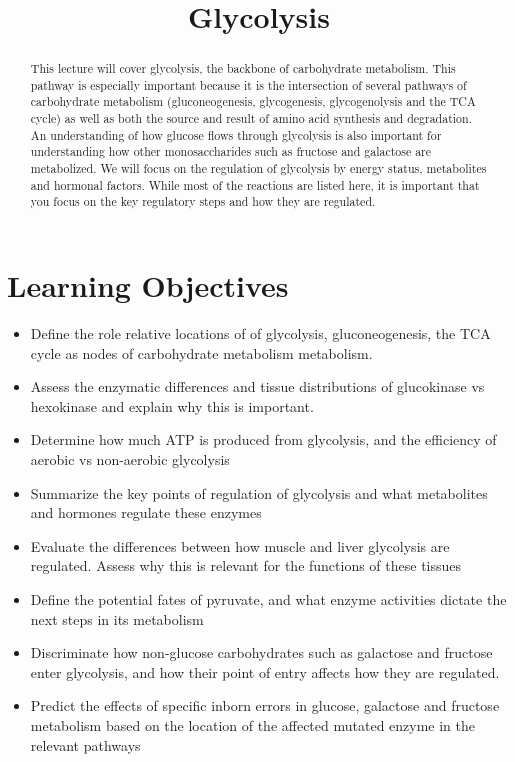 \documentclass{tufte-handout}
\title{Glycolysis}
\author{}
\date{}  %
\begin{document}
\maketitle%

\begin{abstract}
\noindent This lecture will cover glycolysis, the backbone of carbohydrate metabolism.  This pathway is especially important because it is the intersection of several pathways of carbohydrate metabolism (gluconeogenesis, glycogenesis, glycogenolysis and the TCA cycle) as well as both the source and result of amino acid synthesis and degradation.  An understanding of how glucose flows through glycolysis is also important for understanding how other monosaccharides such as fructose and galactose are metabolized.  We will focus on the regulation of glycolysis by energy status, metabolites and hormonal factors.  While most of the reactions are listed here, it is important that you focus on the key regulatory steps and how they are regulated.
\end{abstract}

\tableofcontents
\pagebreak
\section{Learning Objectives}

\begin{itemize}
\item Define the role relative locations of of glycolysis, gluconeogenesis, the TCA cycle as nodes of carbohydrate metabolism metabolism.
\item Assess the enzymatic differences and tissue distributions of glucokinase vs hexokinase and explain why this is important.
\item Determine how much ATP is produced from glycolysis, and the efficiency of aerobic vs non-aerobic glycolysis
\item Summarize the key points of regulation of glycolysis and what metabolites and hormones regulate these enzymes
\item Evaluate the differences between how muscle and liver glycolysis are regulated.  Assess why this is relevant for the functions of these tissues
\item Define the potential fates of pyruvate, and what enzyme activities dictate the next steps in its metabolism
\item Discriminate how non-glucose carbohydrates such as galactose and fructose enter glycolysis, and how their point of entry affects how they are regulated.
\item Predict the effects of specific inborn errors in glucose, galactose and fructose metabolism based on the location of the affected mutated enzyme in the relevant pathways



\end{itemize}
\end{document}
